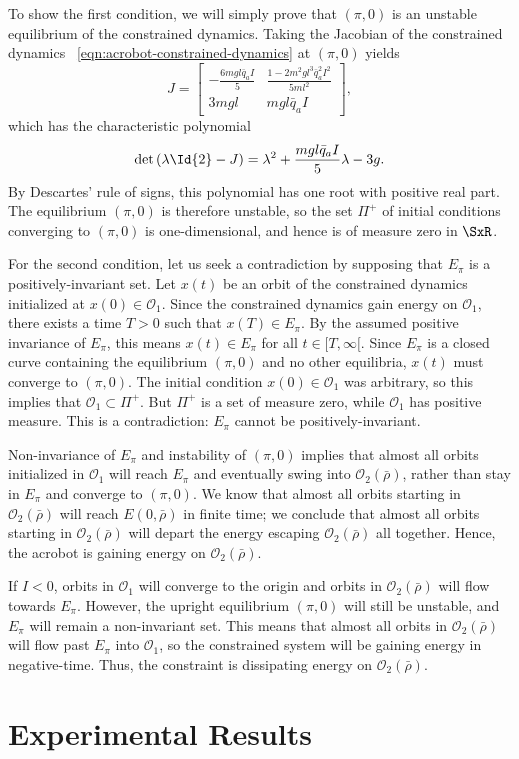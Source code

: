 To show the first condition, we will simply prove that \((\pi,0)\) is an
unstable equilibrium of the constrained dynamics.
Taking the Jacobian of the constrained dynamics
~\eqref{eqn:acrobot-constrained-dynamics} at \((\pi,0)\) yields
\[
    J = \begin{bmatrix}
        -\frac{6mgl\bar{q}_aI}{5} & \frac{1 - 2m^2gl^3\bar{q}_a^2 I^2}{5ml^2} \\
        3mgl & mgl\bar{q}_aI
    \end{bmatrix}
    ,
\]
which has the characteristic polynomial
\[
    \det\left(\lambda \Id{2} - J\right)
    = \lambda^2 + \frac{mgl\bar{q}_a I}{5} \lambda - 3g
    .
\]
By Descartes' rule of signs, this polynomial has one root with positive real
part. 
The equilibrium \((\pi,0)\) is therefore unstable, so the set \(\Pi^+\) of
initial conditions converging to \((\pi,0)\) is one-dimensional, and hence is
of measure zero in \(\SxR\).

For the second condition, let us seek a contradiction by 
supposing that \(E_\pi\) is a positively-invariant set. 
Let \(x(t)\) be an orbit of the constrained dynamics initialized at 
\(x(0) \in \mathcal{O}_1\).
Since the constrained dynamics gain energy on \(\mathcal{O}_1\), there exists a
time \(T > 0\) such that \(x(T) \in E_\pi\).
By the assumed positive invariance of \(E_\pi\), this means 
\(x(t) \in E_\pi\) for all \(t \in [T,\infty[\).
Since \(E_\pi\) is a closed curve containing the equilibrium \((\pi,0)\) and no
other equilibria, \(x(t)\) must converge to \((\pi,0)\).
The initial condition \(x(0) \in \mathcal{O}_1\) was arbitrary, so this implies
that \(\mathcal{O}_1 \subset \Pi^+\).
But \(\Pi^+\) is a set of measure zero, while \(\mathcal{O}_1\) has positive
measure. 
This is a contradiction: \(E_\pi\) cannot be positively-invariant.

Non-invariance of \(E_\pi\) and instability of \((\pi,0)\) implies that 
almost all orbits initialized in \(\mathcal{O}_1\) will reach \(E_\pi\) and
eventually swing into \(\mathcal{O}_2(\bar{\rho})\), rather than stay in \(E_\pi\) and converge to
\((\pi,0)\). 
We know that almost all orbits starting in \(\mathcal{O}_2(\bar{\rho})\) will reach 
\(E(0,\bar{\rho})\) in finite time;
we conclude that almost all orbits starting in \(\mathcal{O}_2(\bar{\rho})\) will depart the energy
escaping \(\mathcal{O}_2(\bar{\rho})\) all together.
Hence, the acrobot is gaining energy on \(\mathcal{O}_2(\bar{\rho})\).

If \(I < 0\), orbits in \(\mathcal{O}_1\) will converge to the origin and orbits in
\(\mathcal{O}_2(\bar{\rho})\) will flow towards \(E_\pi\).
However, the upright equilibrium \((\pi,0)\) will still be unstable, and
\(E_\pi\) will remain a non-invariant set. 
This means that almost all orbits in \(\mathcal{O}_2(\bar{\rho})\) will flow past \(E_\pi\) into
\(\mathcal{O}_1\), so the constrained system will be gaining energy in
negative-time. Thus, the constraint is dissipating energy on \(\mathcal{O}_2(\bar{\rho})\).

\section{Experimental Results}

